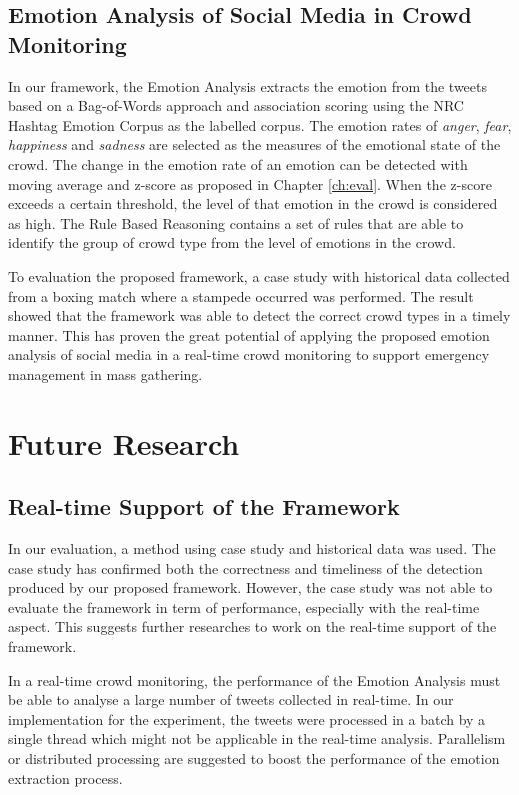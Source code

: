 \subsection{Emotion Analysis of Social Media in Crowd Monitoring}
In our framework, the Emotion Analysis extracts the emotion from the tweets based on a Bag-of-Words approach and association scoring using the NRC Hashtag Emotion Corpus \citep{mohammad2014using} as the labelled corpus. The emotion rates of \textit{anger}, \textit{fear}, \textit{happiness} and \textit{sadness} are selected as the measures of the emotional state of the crowd. The change in the emotion rate of an emotion can be detected with moving average and z-score as proposed in Chapter \ref{ch:eval}. When the z-score exceeds a certain threshold, the level of that emotion in the crowd is considered as high. The Rule Based Reasoning contains a set of rules that are able to identify the group of crowd type from the level of emotions in the crowd. 

To evaluation the proposed framework, a case study with historical data collected from a boxing match where a stampede occurred was performed. The result showed that the framework was able to detect the correct crowd types in a timely manner. This has proven the great potential of applying the proposed emotion analysis of social media in a real-time crowd monitoring to support emergency management in mass gathering.

\section{Future Research}
\subsection{Real-time Support of the Framework}
In our evaluation, a method using case study and historical data was used. The case study has confirmed both the correctness and timeliness of the detection produced by our proposed framework. However, the case study was not able to evaluate the framework in term of performance, especially with the real-time aspect. This suggests further researches to work on the real-time support of the framework.

In a real-time crowd monitoring, the performance of the Emotion Analysis must be able to analyse a large number of tweets collected in real-time. In our implementation for the experiment, the tweets were processed in a batch by a single thread which might not be applicable in the real-time analysis. Parallelism or distributed processing are suggested to boost the performance of the emotion extraction process.

